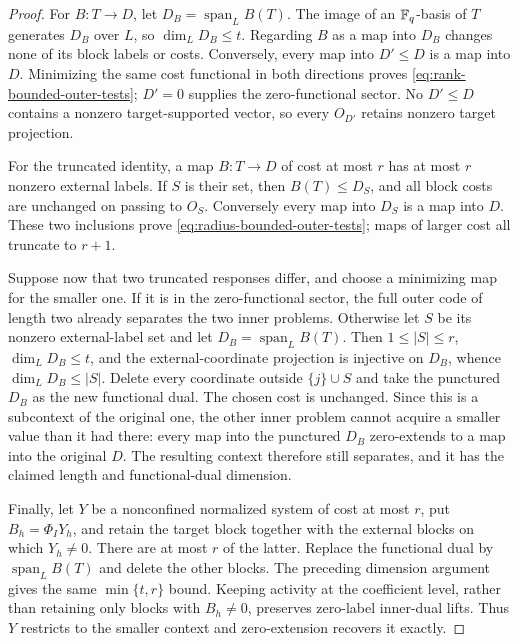 \begin{proof}
For $B:T\to D$, let $D_B=\operatorname{span}_L B(T)$.  The image of an
$\mathbb F_q$-basis of $T$ generates $D_B$ over $L$, so $\dim_LD_B\leq t$.
Regarding $B$ as a map into $D_B$ changes none of its block labels or costs.
Conversely, every map into $D'\leq D$ is a map into $D$.  Minimizing the same
cost functional in both directions proves
\eqref{eq:rank-bounded-outer-tests}; $D'=0$ supplies the zero-functional
sector.  No $D'\leq D$ contains a nonzero target-supported vector, so every
$O_{D'}$ retains nonzero target projection.

For the truncated identity, a map $B:T\to D$ of cost at most $r$ has at most
$r$ nonzero external labels.  If $S$ is their set, then $B(T)\leq D_S$, and
all block costs are unchanged on passing to $O_S$.  Conversely every map into
$D_S$ is a map into $D$.  These two inclusions prove
\eqref{eq:radius-bounded-outer-tests}; maps of larger cost all truncate to
$r+1$.

Suppose now that two truncated responses differ, and choose a minimizing map
for the smaller one.  If it is in the zero-functional sector, the full outer
code of length two already separates the two inner problems.  Otherwise let
$S$ be its nonzero external-label set and let
$D_B=\operatorname{span}_L B(T)$.  Then $1\leq|S|\leq r$,
$\dim_LD_B\leq t$, and the external-coordinate projection is injective on
$D_B$, whence $\dim_LD_B\leq|S|$.  Delete every coordinate outside
$\{j\}\cup S$ and take the punctured $D_B$ as the new functional dual.
The chosen cost is unchanged.  Since this is a subcontext of the original
one, the other inner problem cannot acquire a smaller value than it had
there: every map into the punctured $D_B$ zero-extends to a map into the
original $D$.  The resulting context therefore still separates, and it has the
claimed length and functional-dual dimension.

Finally, let $Y$ be a nonconfined normalized system of cost at most $r$, put
$B_h=\Phi_IY_h$, and retain the target block together with the external blocks
on which $Y_h\ne0$.  There are at most $r$ of the latter.  Replace the
functional dual by $\operatorname{span}_L B(T)$ and delete the other blocks.
The preceding dimension argument gives the same $\min\{t,r\}$ bound.  Keeping
activity at the coefficient level, rather than retaining only blocks with
$B_h\ne0$, preserves zero-label inner-dual lifts.  Thus $Y$ restricts to the
smaller context and zero-extension recovers it exactly.
%
%
\end{proof}


